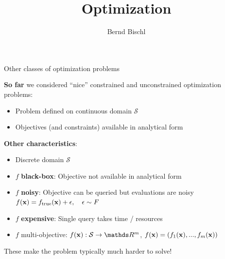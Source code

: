





\newcommand{\titlefigure}{figure_man/GE.pdf}
\newcommand{\learninggoals}{
\item Discrete
\item Black-box
\item Noisy
\item Multi-objective
}



\title{Optimization}
\author{Bernd Bischl}
\date{}



\sloppy

\begin{vbframe}{Other classes of optimization problems}

\textbf{So far} we considered \enquote{nice} constrained and unconstrained optimization problems: 

\begin{itemize}
	\item Problem defined on continuous domain $\mathcal{S}$
	\item Objectives (and constraints) available in analytical form
\end{itemize}

\lz 

\textbf{Other characteristics}: 
\begin{itemize}
	\item Discrete domain $\mathcal{S}$
	\item $f$ \textbf{black-box}: Objective not available in analytical form
	\item $f$ \textbf{noisy}: Objective can be queried but evaluations are noisy $f(\mathbf{x}) = f_{\text{true}}(\mathbf{x}) + \epsilon, \quad \epsilon \sim F$
	\item $f$ \textbf{expensive}: Single query takes time / resources
	\item $f$ multi-objective: $\fx: \mathcal{S} \to \R^m$, $f(\mathbf{x}) = \left(f_1(\mathbf{x}), ..., f_m(\mathbf{x})\right)$
\end{itemize}

\lz 

These make the problem typically much harder to solve!

\end{vbframe}


